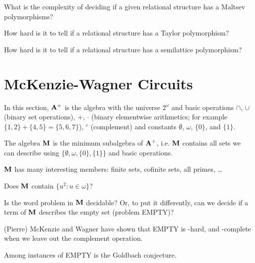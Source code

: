 \begin{question}
  What is the complexity of deciding if a given relational structure has a
  Maltsev polymorphisms?
\end{question}
\begin{question}
  How hard is it to tell if a relational structure has a Taylor polymorphism?
\end{question}
\begin{question}
  How hard is it to tell if a relational structure has a semilattice
  polymorphism?
\end{question}
\section{McKenzie-Wagner Circuits}
In this section, ${\mathbf{A}}^{+}$ is the algebra with the universe $2^\omega$ and basic
operations $\cap$, $\cup$ (binary set operations), $+$, $\cdot$ (binary
elementwise 
arithmetics; for
example $\{1,2\}+\{4,5\}=\{5,6,7\}$), ${}^{c}$ (complement) and constants 
$\emptyset$, $\omega$, $\{0\}$, and $\{1\}$.

The algebra ${\mathbf{M}}$ is the minimum subalgebra of ${\mathbf{A}}^{+}$, i.e. ${\mathbf{M}}$ contains
all sets we can describe using $\{\emptyset,\omega, \{0\},\{1\}\}$ and basic
operations.

${\mathbf{M}}$ has many interesting members: finite sets, cofinite sets, all primes,
\dots
\begin{question}
  Does ${\mathbf{M}}$ contain $\{u^2\colon u\in\omega\}$?
\end{question}
\begin{question}
  Is the word problem in ${\mathbf{M}}$ decidable? Or, to put it differently, can we
  decide if a term of ${\mathbf{M}}$ describes the empty set (problem EMPTY)?
\end{question}
\begin{context}
  (Pierre) McKenzie and Wagner have shown that EMPTY is \compNEXPTIME-hard, and
  \compNEXPTIME-complete when we leave out the complement operation.

  Among instances of EMPTY is the Goldbach conjecture.
\end{context}




